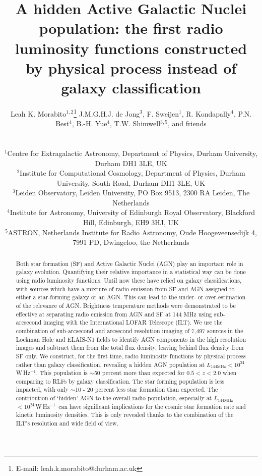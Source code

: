 \documentclass[usenatbib,fleqn,letters]{mnras}
\title[A hidden AGN population]{A hidden Active Galactic Nuclei population: the first radio luminosity functions constructed by physical process instead of galaxy classification}
\author[L.K. Morabito]{\parbox{\textwidth}{Leah K. Morabito$^{1,2}$\thanks{E-mail: leah.k.morabito@durham.ac.uk}\orcidlink{0000-0003-0487-6651}
J.M.G.H.J. de Jong$^{3}$,
F. Sweijen$^{1}$,
R. Kondapally$^{4}$,
P.N. Best$^{4}$,
B.-H. Yue$^{4}$\orcidlink{0009-0009-8935-2929}, 
T.W. Shimwell$^{3,5}$, and friends
\\}\\ 
$^{1}$Centre for Extragalactic Astronomy, Department of Physics, Durham University, Durham DH1 3LE, UK \\
$^{2}$Institute for Computational Cosmology, Department of Physics, Durham University, South Road, Durham DH1 3LE, UK \\ 
$^{3}$Leiden Observatory, Leiden University, PO Box 9513, 2300 RA Leiden, The Netherlands \\
$^{4}$Institute for Astronomy, University of Edinburgh Royal Observatory, Blackford Hill, Edinburgh, EH9 3HJ, UK \\
$^{5}$ASTRON, Netherlands Institute for Radio Astronomy, Oude Hoogeveensedijk 4, 7991 PD, Dwingeloo, the Netherlands \\}
\newcommand{\wphz}{$\,$W$\,$Hz$^{-1}$}
\newcommand{\llof}{$L_{\textrm{144MHz}}$}
\begin{document}
\date{}
\pagerange{\pageref{firstpage}--\pageref{lastpage}} 
\maketitle

\label{firstpage}


\begin{abstract}
Both star formation (SF) and Active Galactic Nuclei (AGN) play an important role in galaxy evolution. Quantifying their relative importance in a statistical way can be done using radio luminosity functions. Until now these have relied on galaxy classifications, with sources which have a mixture of radio emission from SF and AGN assigned to either a star-forming galaxy or an AGN. This can lead to the under- or over-estimation of the relevance of AGN. Brightness temperature methods were demonstrated to be effective at separating radio emission from AGN and SF at 144 MHz using sub-arcsecond imaging with the International LOFAR Telescope (ILT). We use the combination of sub-arcsecond and arcsecond resolution imaging of 7,497 sources in the Lockman Hole and ELAIS-N1 fields to identify AGN components in the high resolution images and subtract them from the total flux density, leaving behind flux density from SF only. We construct, for the first time, radio luminosity functions by physical process rather than galaxy classification, revealing a hidden AGN population at \llof $<10^{24}$\wphz . This population is $\sim$50 percent more than expected for $0.5<z<2.0$ when comparing to RLFs by galaxy classification. The star forming population is less impacted, with only $\sim$10 - 20 percent less star formation than expected. The contribution of `hidden' AGN to the overall radio population, especially at \llof $<10^{24}$\wphz\ can have significant implications for the cosmic star formation rate and kinetic luminosity densities. This is only revealed thanks to the combination of the ILT's resolution and wide field of view. \vspace{3.7in}
\end{abstract}




\end{document}
